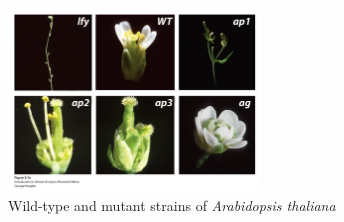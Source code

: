 \begin{figure}
    \centering
\includegraphics[width=0.6\textwidth]{img/arabidopsis_mutations.png}
\caption[]{Wild-type and mutant strains of \textit{Arabidopsis thaliana} \cite{Griffiths2015IntroductionAnalysis}} 
\label{fig:arabidopsis_mutants}
\end{figure}